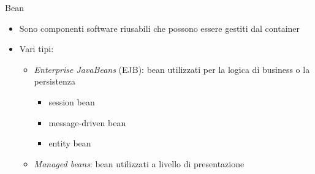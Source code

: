 \begin{frame}{Bean}

\begin{itemize}
\item Sono componenti software riusabili che possono essere gestiti dal container

\vspace{1em}

\item Vari tipi:
	\begin{itemize}
	
	\vspace{0.8em}
	
	\item \textsl{Enterprise JavaBeans} (EJB): bean utilizzati per la logica di business o la persistenza
		\begin{itemize}
		\item session bean
		\item message-driven bean
		\item entity bean
		\end{itemize}
	
	\vspace{0.8em}
	
	\item  \textsl{Managed beans}: bean utilizzati a livello di presentazione
	\end{itemize}

\end{itemize}

\end{frame}


